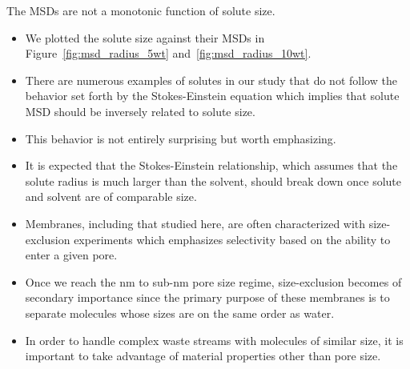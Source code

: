 \documentclass{article}
\begin{document}
  \noindent The MSDs are not a monotonic function of solute size.
  \begin{itemize}
  	\item We plotted the solute size against their MSDs in Figure~\ref{fig:msd_radius_5wt} and~\ref{fig:msd_radius_10wt}.
  	\item There are numerous examples of solutes in our study that do not 
  	follow the behavior set forth by the Stokes-Einstein equation which 
  	implies that solute MSD should be inversely related to solute size.  %
  	\item This behavior is not entirely surprising but worth emphasizing. 
  	\item It is expected that the Stokes-Einstein relationship, which assumes that 
  	the solute radius is much larger than the solvent, should break down once
  	solute and solvent are of comparable size.

  	\item Membranes, including that studied here, are often characterized 
  	with size-exclusion experiments which emphasizes selectivity based on the ability
  	to enter a given pore. 
  	\item Once we reach the nm to sub-nm pore size regime, size-exclusion 
  	becomes of secondary importance since the primary purpose of these membranes is to 
  	separate molecules whose sizes are on the same order as water.
  	\item In order to handle complex waste streams with molecules of similar size,
  	it is important to take advantage of material properties other than pore size. 
  \end{itemize}
  
\end{document}
